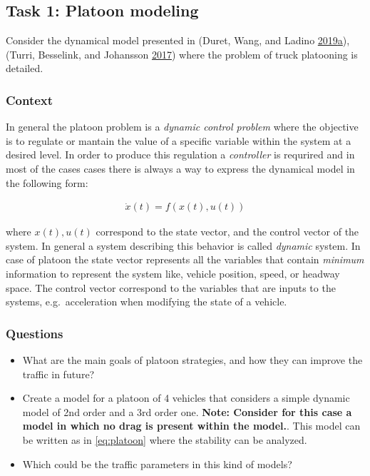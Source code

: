 \documentclass[]{book}
\providecommand{\tightlist}{%
  \setlength{\itemsep}{0pt}\setlength{\parskip}{0pt}}
\theoremstyle{definition}
\theoremstyle{definition}
\theoremstyle{definition}
\theoremstyle{remark}
\begin{document}
\hypertarget{task-1-platoon-modeling}{%
\subsection*{Task 1: Platoon modeling}\label{task-1-platoon-modeling}}

Consider the dynamical model presented in (Duret, Wang, and Ladino
\protect\hyperlink{ref-Duret2019:ISTTT}{2019}\protect\hyperlink{ref-Duret2019:ISTTT}{a}),
(Turri, Besselink, and Johansson
\protect\hyperlink{ref-Turri2017}{2017}) where the problem of truck
platooning is detailed.

\hypertarget{context-5}{%
\subsubsection*{Context}\label{context-5}}

In general the platoon problem is a \emph{dynamic control problem} where
the objective is to regulate or mantain the value of a specific variable
within the system at a desired level. In order to produce this
regulation a \emph{controller} is requrired and in most of the cases
cases there is always a way to express the dynamical model in the
following form:

\begin{align}
\dot{x}(t) = f(x(t), u(t)) \label{eq:platoon}
\end{align}

where \(x(t), u(t)\) correspond to the state vector, and the control
vector of the system. In general a system describing this behavior is
called \emph{dynamic} system. In case of platoon the state vector
represents all the variables that contain \emph{minimum} information to
represent the system like, vehicle position, speed, or headway space.
The control vector correspond to the variables that are inputs to the
systems, e.g.~acceleration when modifying the state of a vehicle.

\hypertarget{questions-4}{%
\subsubsection*{Questions}\label{questions-4}}

\begin{itemize}
\tightlist
\item
  What are the main goals of platoon strategies, and how they can
  improve the traffic in future?
\item
  Create a model for a platoon of 4 vehicles that considers a simple
  dynamic model of 2nd order and a 3rd order one. \textbf{Note: Consider
  for this case a model in which no drag is present within the model.}.
  This model can be written as in \eqref{eq:platoon} where the stability
  can be analyzed.
\item
  Which could be the traffic parameters in this kind of models?
\end{itemize}
\end{document}
